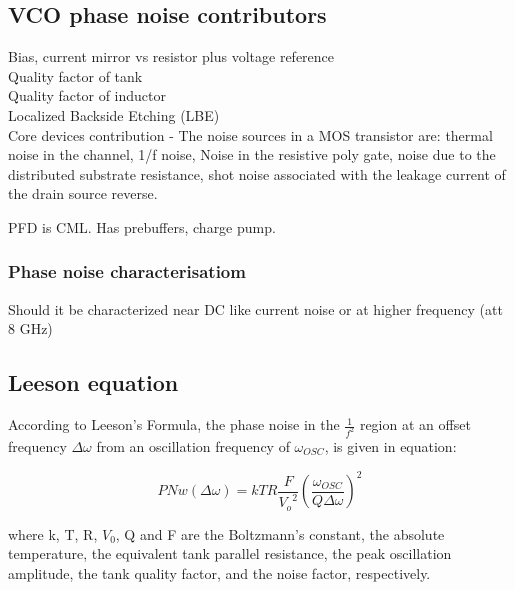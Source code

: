 \documentclass{article}
\begin{document}

\subsection{VCO phase noise contributors}

Bias, current mirror vs resistor plus voltage reference %
\\
Quality factor of tank %
\\
Quality factor of inductor
\\
Localized Backside Etching (LBE)
\\
Core devices contribution - The noise sources in a MOS transistor are: thermal noise in the channel, 1/f noise, Noise in the resistive poly gate, noise due to the distributed substrate resistance, shot noise associated with the leakage current of the drain source reverse.

PFD is CML. Has prebuffers, charge pump.

\subsubsection*{Phase noise characterisatiom}

Should it be characterized near DC like current noise or at higher frequency (att 8 \unit{GHz})

\subsection*{Leeson equation}

According to Leeson's Formula, the phase noise in the $\frac{1}{f^2}$ region at an offset frequency $\Delta \omega$ from an oscillation frequency of $\omega_{OSC}$, is given in equation:

\begin{equation}
	PNw(\Delta \omega) = kTR \dfrac{F}{{V_o}^2} {(\dfrac{\omega_{OSC}}{Q \Delta \omega})}^2
\end{equation}

where k, T, R, $V_0$, Q and F are the Boltzmann's constant, the absolute temperature, the equivalent tank parallel resistance, the peak oscillation amplitude, the tank quality factor, and the noise factor, respectively.

\end{document}

